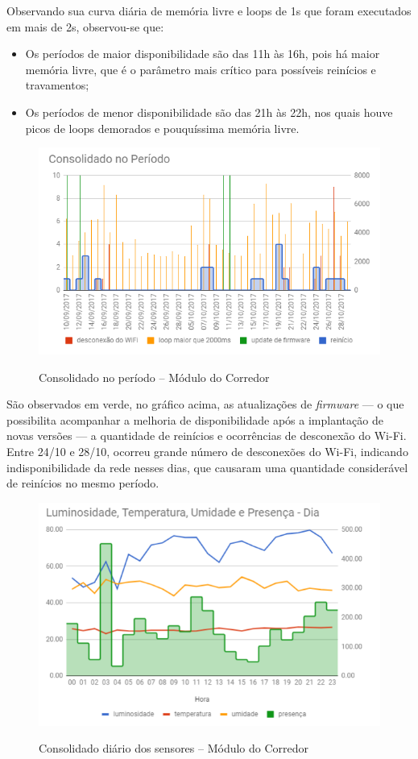Observando sua curva diária de memória livre e loops de 1s que foram executados em mais de 2s, observou-se que:

\begin{itemize}
	\item Os períodos de maior disponibilidade são das 11h às 16h, pois há maior memória livre, que é o parâmetro mais crítico para possíveis reinícios e travamentos;
	\item Os períodos de menor disponibilidade são das 21h às 22h, nos quais houve picos de loops demorados e pouquíssima memória livre.
\end{itemize}

\begin{figure}[H]
	\centering
	\caption{Consolidado no período -- Módulo do Corredor}
	\includegraphics[width=1.0\textwidth]{periodoCorredor}
	\label{fig:periodoCorredor}
\end{figure}

São observados em verde, no gráfico acima, as atualizações de \emph{firmware} --- o que possibilita acompanhar a melhoria de disponibilidade após a implantação de novas versões --- a quantidade de reinícios e ocorrências de desconexão do Wi-Fi. Entre 24/10 e 28/10, ocorreu grande número de desconexões do Wi-Fi, indicando indisponibilidade da rede nesses dias, que causaram uma quantidade considerável de reinícios no mesmo período.

\begin{figure}[H]
	\centering
	\caption{Consolidado diário dos sensores -- Módulo do Corredor}
	\includegraphics[width=1.0\textwidth]{sensoresdiaCorredor}
	\label{fig:sensoresdiaCorredor}
\end{figure}

